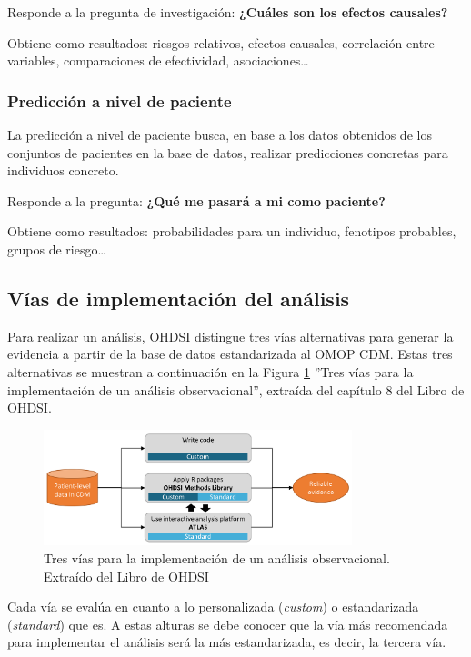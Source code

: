 Responde a la pregunta de investigación: \textbf{¿Cuáles son los efectos causales?}

Obtiene como resultados: riesgos relativos, efectos causales, correlación entre variables, comparaciones de efectividad, asociaciones…

\subsubsection{Predicción a nivel de paciente}

La predicción a nivel de paciente busca, en base a los datos obtenidos de los conjuntos de pacientes en la base de datos, realizar predicciones concretas para individuos concreto.

Responde a la pregunta: \textbf{¿Qué me pasará a mi como paciente?}

Obtiene como resultados: probabilidades para un individuo, fenotipos probables, grupos de riesgo… 


\subsection{Vías de implementación del análisis} \label{subsec:05vias}

Para realizar un análisis, OHDSI distingue tres vías alternativas para generar la evidencia a partir de la base de datos estandarizada al OMOP CDM. Estas tres alternativas se muestran a continuación en la Figura \ref{fig:analysisImplementations} ''Tres vías para la implementación de un análisis observacional'', extraída del capítulo 8 del Libro de OHDSI.

\begin{figure}[H]
    \centering
    \includegraphics[width=0.80\textwidth]{figures/analysisImplementations.png}
     \caption{Tres vías para la implementación de un análisis observacional. Extraído del Libro de OHDSI \cite{OHDSIbook}}
    \label{fig:analysisImplementations}
\end{figure}

Cada vía se evalúa en cuanto a lo personalizada (\textit{custom}) o estandarizada (\textit{standard}) que es. A estas alturas se debe conocer que la vía más recomendada para implementar el análisis será la más estandarizada, es decir, la tercera vía.

